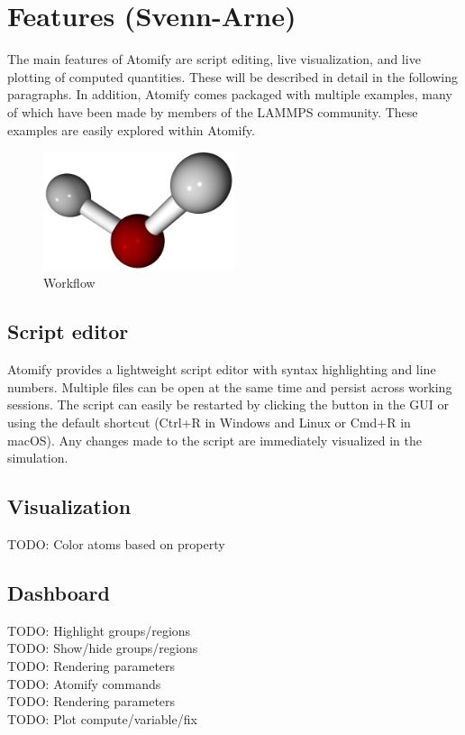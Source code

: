 \documentclass[aps,pre,twocolumn,letterpaper,floatfix]{revtex4}
\begin{document}
\section{Features (Svenn-Arne)}

The main features of Atomify are script editing,
live visualization, and live plotting of computed quantities.
These will be described in detail in the following paragraphs.
In addition, Atomify comes packaged with multiple examples,
many of which have been made by members of the LAMMPS community.
These examples are easily explored within Atomify.

\begin{figure}
	\centering
	\includegraphics[width=0.5\textwidth]{final_billboard.png}
	\caption{Workflow}
	\label{fig:gui}
\end{figure}


\subsection{Script editor}
Atomify provides a lightweight script editor with syntax highlighting and line
numbers.
Multiple files can be open at the same time and persist across working sessions.
The script can easily be restarted by clicking the button in the GUI or using
the default shortcut (Ctrl+R in Windows and Linux or Cmd+R in macOS).
Any changes made to the script are immediately visualized in the simulation.

\subsection{Visualization}
TODO: Color atoms based on property \\

\subsection{Dashboard}
TODO: Highlight groups/regions \\
TODO: Show/hide groups/regions \\
TODO: Rendering parameters \\
TODO: Atomify commands \\
TODO: Rendering parameters \\
TODO: Plot compute/variable/fix \\
\end{document}
